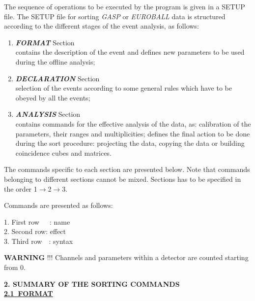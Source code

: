 The sequence of operations to be executed by the program is given in a SETUP
file.
The SETUP file for sorting {\it GASP} or {\it EUROBALL} data is structured 
according to the different stages of the event analysis, as follows:

\begin{enumerate}
 \item	{\bf\it FORMAT} Section \\
        contains the description of the event and defines new parameters 
        to be used during the offline analysis;

 \item	{\bf\it DECLARATION} Section \\
	selection of the events according to some general rules which have 
	to be obeyed by all the events;

 \item	{\bf\it ANALYSIS} Section \\    
	contains commands for the effective analysis of the data, as: 
	calibration of the parameters, their ranges and multiplicities; 
	defines the final action to be done during the sort procedure: 
	projecting the data, copying the data or building coincidence cubes 
	and matrices.
\end{enumerate}

The commands specific to each section are presented below. Note 
that commands belonging to different sections cannot be mixed. Sections
has to be specified in the order 1$\rightarrow$2$\rightarrow$3.

Commands are presented as follows: 

\hskip2cm\parbox[t]{7cm} 
{
	1. First row~~~: name   \\
	2. Second row: effect  \\ 
	3. Third row~~: syntax 
}
\bigskip
\bigskip

\noindent
{\bf WARNING} !!! \hskip1cm Channels and parameters within a detector are 
counted starting from 0.

\newpage

\noindent
{\large\bf 2. SUMMARY OF THE SORTING COMMANDS} \\

\bigskip
{\large\underline{\bf 2.1~FORMAT}} \\

